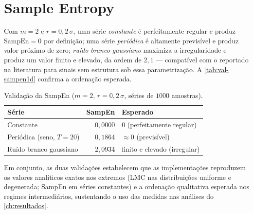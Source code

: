 \section{Sample Entropy}
\label{sec:ap-validacao-sampen1d}

Com $m = 2$ e $r = 0{,}2\,\sigma$, uma série \emph{constante} é
perfeitamente regular e produz $\mathrm{SampEn} = 0$ por definição; uma série
\emph{periódica} é altamente previsível e produz valor próximo de zero;
\emph{ruído branco gaussiano} maximiza a irregularidade e produz um valor finito
e elevado, da ordem de $2{,}1$ --- compatível com o reportado na literatura para
sinais sem estrutura sob essa parametrização. A \autoref{tab:val-sampen1d}
confirma a ordenação esperada.

\begin{table}[H]
  \centering
  \caption{Validação da SampEn ($m = 2$, $r = 0{,}2\,\sigma$, séries de
  $1000$ amostras).}
  \label{tab:val-sampen1d}
  \begin{tabular}{lrl}
    \toprule
    Série & SampEn & Esperado \\
    \midrule
    Constante                 & $0{,}0000$ & $0$ (perfeitamente regular) \\
    Periódica (seno, $T=20$)  & $0{,}1864$ & $\approx 0$ (previsível) \\
    Ruído branco gaussiano    & $2{,}0934$ & finito e elevado (irregular) \\
    \bottomrule
  \end{tabular}
\end{table}

Em conjunto, as duas validações estabelecem que as implementações reproduzem os
valores analíticos exatos nos extremos (LMC nas distribuições uniforme e
degenerada; SampEn em séries constantes) e a ordenação qualitativa esperada nos
regimes intermediários, sustentando o uso das medidas nas análises do
\autoref{ch:resultados}.
